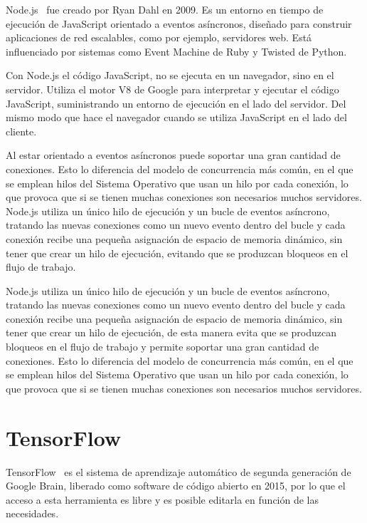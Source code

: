 \documentclass[a4paper, 12pt]{book}
\begin{document}
Node.js~\cite{Pagina_de_Node} fue creado por Ryan Dahl en 2009. Es un entorno en tiempo de ejecución de JavaScript orientado a eventos asíncronos, diseñado para construir aplicaciones de red escalables, como por ejemplo, servidores web. 
Está influenciado por sistemas como Event Machine de Ruby y Twisted de Python.

Con Node.js el código JavaScript, no se ejecuta en un navegador, sino en el servidor. Utiliza el motor V8 de Google para interpretar y ejecutar el código JavaScript, suministrando un entorno de ejecución en el lado del servidor. 
Del mismo modo que hace el navegador cuando se utiliza JavaScript en el lado del cliente.

Al estar orientado a eventos asíncronos puede soportar una gran cantidad de conexiones. 
Esto lo diferencia del modelo de concurrencia más común, en el que se emplean hilos del Sistema Operativo que usan un hilo por cada conexión, lo que provoca que si se tienen muchas conexiones son necesarios muchos servidores. 
Node.js utiliza un único hilo de ejecución y un bucle de eventos asíncrono, tratando las nuevas conexiones como un nuevo evento dentro del bucle y cada conexión recibe una pequeña asignación de espacio de memoria dinámico, sin tener que crear un hilo de ejecución, evitando que se produzcan bloqueos en el flujo de trabajo. 

Node.js utiliza un único hilo de ejecución y un bucle de eventos asíncrono, tratando las nuevas conexiones como un nuevo evento dentro del bucle y cada conexión recibe una pequeña asignación de espacio de memoria dinámico, sin tener que crear un hilo de ejecución, de esta manera evita que se produzcan bloqueos en el flujo de trabajo y permite soportar una gran cantidad de conexiones. 
Esto lo diferencia del modelo de concurrencia más común, en el que se emplean hilos del Sistema Operativo que usan un hilo por cada conexión, lo que provoca que si se tienen muchas conexiones son necesarios muchos servidores.

\section{TensorFlow} 
\label{sec:TensorFlow}

TensorFlow~\cite{Pagina_de_TensorFlow} es el sistema de aprendizaje automático de segunda generación de Google Brain, liberado como software de código abierto en 2015, por lo que el acceso a esta herramienta es libre y es posible editarla en función de las necesidades. 
\end{document}
